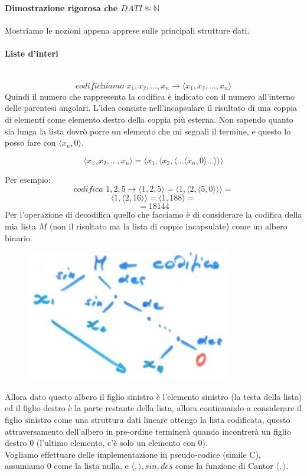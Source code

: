 \documentclass{article}
\begin{document}
\paragraph{Dimostrazione rigorosa che $DATI\approxeq\mathbb{N}$}
Mostriamo le nozioni appena apprese sulle principali strutture dati.
\paragraph{Liste d'interi}\mbox{}\\
$$\textit{codifichiamo } x_1,x_2,...,x_n\rightarrow\langle x_1,x_2,...,x_n\rangle$$
Quindi il numero che rappresenta la codifica è indicato con il numero all'interno delle parentesi angolari.
L'idea consiste nell'incapsulare il risultato di una coppia di elementi come elemento destro
della coppia più esterna. Non sapendo quanto sia lunga la lista dovrò porre un elemento che mi
segnali il termine, e questo lo posso fare con $\langle x_n,0 \rangle$.

$$\langle x_1,x_2,...,x_n\rangle = \langle x_1,\langle x_2,\langle ...\langle x_n,0\rangle ...\rangle\rangle\rangle$$

\noindent Per esempio:
$$\textit{codifica }1,2,5\rightarrow\langle 1,2,5\rangle=\langle 1,\langle 2,\langle 5,0\rangle\rangle\rangle=$$
$$\langle 1,\langle2,16\rangle\rangle=\langle 1,188\rangle=$$
$$=18144$$
Per l'operazione di decodifica quello che facciamo è di considerare la codifica della mia lista $M$ (non il
risultato ma la lista di coppie incapsulate) come un albero binario.
\begin{figure}[H]
    \centering
    \includegraphics[scale=0.5]{images/bin.png}
\end{figure}

Allora dato questo albero il figlio
sinistro è l'elemento sinistro (la testa della lista) ed il figlio destro è la parte restante della lista,
allora continuando a considerare il figlio sinistro come una struttura dati lineare ottengo
la lista codificata, questo attraversamento dell'albero in pre-ordine terminerà quando incontrerà un
figlio destro $0$ (l'ultimo elemento, c'è solo un elemento  con $0$).\\Vogliamo effettuare
delle implementazione in pseudo-codice (simile C), assumiamo $0$ come la lista nulla, e $\langle,\rangle,sin,des$
come la funzione di Cantor $\langle , \rangle$.
\end{document}
